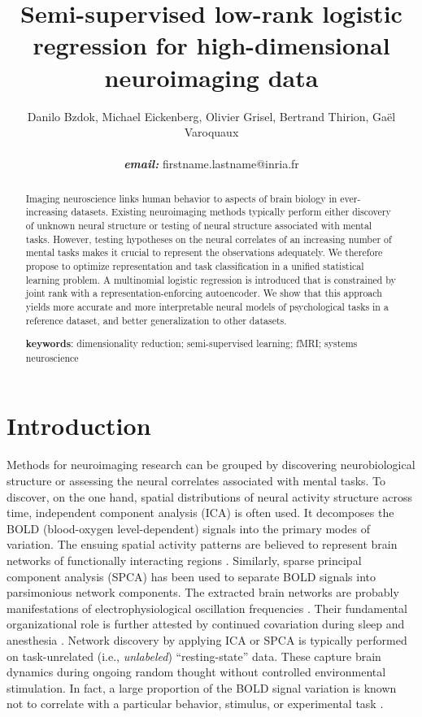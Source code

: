 \documentclass{article} %
\title{Semi-supervised low-rank logistic regression for
high-dimensional neuroimaging data}
\begin{document}
\author{Danilo Bzdok, Michael Eickenberg, Olivier Grisel,
  Bertrand Thirion,
  Ga\"el Varoquaux \\\\\textbf{\textit{email:} }firstname.lastname@inria.fr}

\maketitle

\begin{abstract}
Imaging neuroscience links human behavior to aspects of brain
biology in ever-increasing datasets.
%
Existing neuroimaging methods typically perform either discovery of unknown
neural structure or testing of neural structure associated with mental tasks.
%
However, testing hypotheses on the neural correlates of an increasing number of mental tasks makes it crucial to represent the observations adequately.
%
We therefore propose to optimize
representation and task classification in
a unified statistical learning problem.
%
A multinomial logistic regression is introduced that is
constrained by joint rank with a representation-enforcing
autoencoder.
%
We show that this approach yields more accurate and more interpretable
neural models of psychological tasks in a reference dataset, and better generalization to other datasets.
%

\textbf{keywords}: dimensionality reduction; semi-supervised learning;
fMRI; systems neuroscience

\end{abstract}

\section{Introduction}
%
Methods for neuroimaging research can be grouped by discovering
neurobiological structure or assessing the neural correlates associated
with mental tasks.
To discover, on the one hand, spatial distributions of neural activity
structure across time,
independent component analysis (ICA) \cite{beckmann2005} is often used.
It decomposes the BOLD (blood-oxygen level-dependent) signals into the
primary modes of variation.
The ensuing spatial activity patterns are believed to represent
brain networks of
functionally interacting regions \cite{smith2009}.
Similarly, sparse principal component analysis (SPCA) \cite{varoqu2011}
has been used to
separate BOLD signals into parsimonious network components.
The extracted brain networks are probably
manifestations of electrophysiological oscillation frequencies \cite{hipp15}.
Their fundamental organizational role is further
attested by continued covariation during sleep and anesthesia \cite{fox07}.
%
Network discovery by applying ICA or SPCA is typically performed on
task-unrelated (i.e., \textit{unlabeled}) ``resting-state'' data.
These capture brain dynamics
during ongoing random thought without controlled environmental stimulation.
In fact, a large proportion of the BOLD signal variation
is known
not to correlate with a particular behavior, stimulus, or experimental task
\cite{fox07}. 
\end{document}
